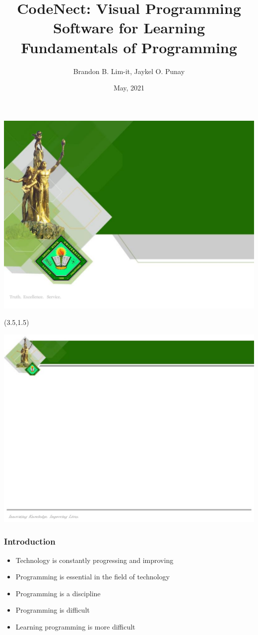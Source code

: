 \documentclass{beamer}
\title{CodeNect: Visual Programming Software for Learning Fundamentals of Programming}
\author{Brandon B. Lim-it, Jaykel O. Punay}
\date{May, 2021}
\begin{document}
{\includegraphics[width=\paperwidth,height=\paperheight,keepaspectratio]{template_title.png}}

\begin{frame}
	\begin{textblock}{6}(3.5,1.5)
		\titlepage
	\end{textblock}
\end{frame}

{\includegraphics[width=\paperwidth,height=\paperheight,keepaspectratio]{template.png}}

\begin{frame}
	\frametitle{Introduction}
	\begin{itemize}
			\item<1-> Technology is constantly progressing and improving
			\item<2-> Programming is essential in the field of technology
			\item<3-> Programming is a discipline
			\item<4-> Programming is difficult
			\item<5-> Learning programming is more difficult
	\end{itemize}
\end{frame}
\end{document}

